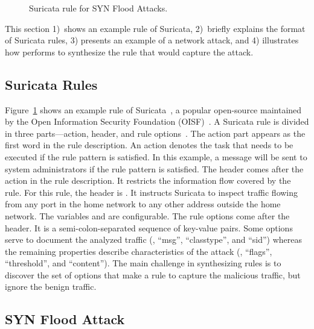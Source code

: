\documentclass[runningheads]{llncs}
\begin{document}
\begin{figure}[t]
  
  \caption{Suricata rule for SYN Flood Attacks.}
  \label{fig:synflood-example}
\end{figure}

This section 1)~shows an example rule of Suricata, 2)~briefly explains
the format of Suricata rules, 3) presents an example of a network
attack, and 4) illustrates how \tname{} performs to synthesize the
rule that would capture the attack.

\subsection{Suricata Rules}
\label{sec:example-suricata-rules}

Figure~\ref{fig:synflood-example} shows an example rule of
Suricata~\cite{suricata}, a popular open-source \nids{} maintained by
the Open Information Security Foundation (OISF)~\cite{oisf}. A
Suricata rule is divided in three parts---action, header, and rule
options~\cite{suri-rule-format}. The action part appears as the first
word in the rule description. An action denotes the task that needs to
be executed if the rule pattern is satisfied. In this example, a
message will be sent to system administrators if the rule pattern is
satisfied. The header comes after the action in the rule
description. It restricts the information flow covered by the
rule. For this rule, the header is . It instructs Suricata to inspect 
traffic flowing from any port in the home network to any other address
outside the home network. The variables  and
 are configurable. The rule options come after
the header. It is a semi-colon-separated sequence of key-value
pairs. Some options serve to document the analyzed traffic (\eg{},
``msg'', ``classtype'', and ``sid'') whereas the remaining properties
describe characteristics of the attack (\eg, ``flags'', ``threshold'',
and ``content''). The main challenge in synthesizing rules is to
discover the set of options that make a rule to capture the malicious
traffic, but ignore the benign traffic.

\subsection{SYN Flood Attack}
\end{document}
